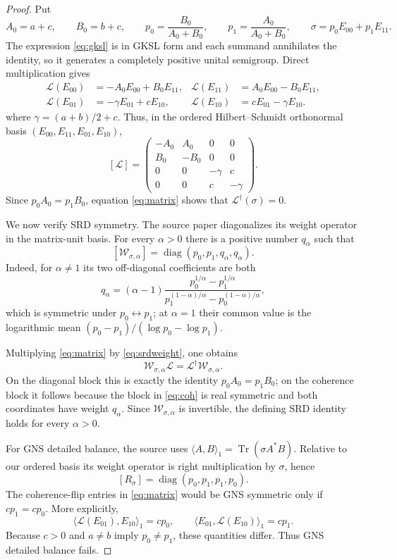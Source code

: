 \documentclass[10pt]{article}
\newcommand{\Tr}{\operatorname{Tr}}
\newcommand{\cL}{\mathcal L}
\newcommand{\W}{\mathcal W}
\begin{document}
\begin{proof}
Put
\[
 A_0=a+c,\qquad B_0=b+c,\qquad
 p_0=\frac{B_0}{A_0+B_0},\qquad
 p_1=\frac{A_0}{A_0+B_0},\qquad
 \sigma=p_0E_{00}+p_1E_{11}.
\]
The expression \eqref{eq:gksl} is in GKSL form and each summand annihilates
the identity, so it generates a completely positive unital semigroup.  Direct
multiplication gives
\begin{align}
 \cL(E_{00})&=-A_0E_{00}+B_0E_{11},
 &\cL(E_{11})&=A_0E_{00}-B_0E_{11},\label{eq:diag}\\
 \cL(E_{01})&=-\gamma E_{01}+cE_{10},
 &\cL(E_{10})&=cE_{01}-\gamma E_{10}.\label{eq:coh}
\end{align}
where $\gamma=(a+b)/2+c$.  Thus, in the ordered Hilbert--Schmidt orthonormal
basis $(E_{00},E_{11},E_{01},E_{10})$,
\begin{equation}\label{eq:matrix}
 [\cL]=
 \begin{pmatrix}
 -A_0&A_0&0&0\\
 B_0&-B_0&0&0\\
 0&0&-\gamma&c\\
 0&0&c&-\gamma
 \end{pmatrix}.
\end{equation}
Since $p_0A_0=p_1B_0$, equation \eqref{eq:matrix} shows that
$\cL^\dagger(\sigma)=0$.

We now verify SRD symmetry.  The source paper diagonalizes its weight operator
in the matrix-unit basis.  For every $\alpha>0$ there is a positive number
$q_\alpha$ such that
\begin{equation}\label{eq:srdweight}
 [\W_{\sigma,\alpha}]
   =\operatorname{diag}(p_0,p_1,q_\alpha,q_\alpha).
\end{equation}
Indeed, for $\alpha\ne1$ its two off-diagonal coefficients are both
\[
 q_\alpha=(\alpha-1)
 \frac{p_0^{1/\alpha}-p_1^{1/\alpha}}
 {p_1^{(1-\alpha)/\alpha}-p_0^{(1-\alpha)/\alpha}},
\]
which is symmetric under $p_0\leftrightarrow p_1$; at $\alpha=1$ their common
value is the logarithmic mean $(p_0-p_1)/(\log p_0-\log p_1)$.

Multiplying \eqref{eq:matrix} by \eqref{eq:srdweight}, one obtains
\[
 \W_{\sigma,\alpha}\cL=\cL^\dagger\W_{\sigma,\alpha}.
\]
On the diagonal block this is exactly the identity $p_0A_0=p_1B_0$;
on the coherence block it follows because the block in \eqref{eq:coh} is real
symmetric and both coordinates have weight $q_\alpha$.  Since
$\W_{\sigma,\alpha}$ is invertible, the defining SRD identity holds for every
$\alpha>0$.

For GNS detailed balance, the source uses
$\langle A,B\rangle_1=\Tr(\sigma A^*B)$.  Relative to our ordered basis its
weight operator is right multiplication by $\sigma$, hence
\[
 [R_\sigma]=\operatorname{diag}(p_0,p_1,p_1,p_0).
\]
The coherence-flip entries in \eqref{eq:matrix} would be GNS symmetric only if
$cp_1=cp_0$.  More explicitly,
\[
 \langle\cL(E_{01}),E_{10}\rangle_1=cp_0,
 \qquad
 \langle E_{01},\cL(E_{10})\rangle_1=cp_1.
\]
Because $c>0$ and $a\ne b$ imply $p_0\ne p_1$, these quantities differ.
Thus GNS detailed balance fails.


\end{proof}
\end{document}
